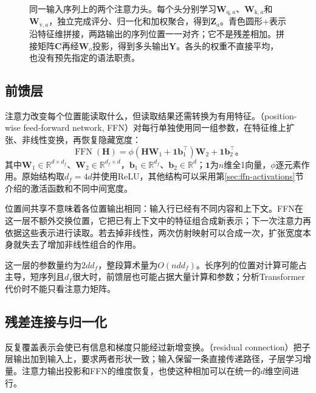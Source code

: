\begin{figure}[p]
  \centering
  
  \caption{同一输入序列上的两个注意力头。每个头分别学习$\bm W_{\mathrm q,a}$、$\bm W_{\mathrm k,a}$和$\bm W_{\mathrm v,a}$，独立完成评分、归一化和加权聚合，得到$\bm Z_a$。青色圆形$+$表示沿特征维拼接，两路输出的序列位置一一对齐；它不是残差相加。拼接矩阵$\bm C$再经$\bm W_{\mathrm o}$投影，得到多头输出$\bm Y$。各头的权重不直接平均，也没有预先指定的语法职责。}
  \label{fig:transformer-multihead}
\end{figure}
\FloatBarrier

\subsection{前馈层}
\label{sec:transformer-feedforward}

注意力改变每个位置能读取什么，但读取结果还需转换为有用特征。（position-wise feed-forward network, FFN）对每行单独使用同一组参数，在特征维上扩张、非线性变换，再恢复隐藏宽度：
\begin{equation}
  \operatorname{FFN}(\bm H)
  =\phi(\bm H\bm W_1+\bm 1\bm b_1^{\top})\bm W_2
      +\bm 1\bm b_2^{\top}\text{。}
  \label{eq:transformer-ffn}
\end{equation}
其中$\bm W_1\in\mathbb R^{d\times d_f}$、$\bm W_2\in\mathbb R^{d_f\times d}$，$\bm b_1\in\mathbb R^{d_f}$、$\bm b_2\in\mathbb R^d$；$\bm 1$为$n$维全1向量，$\phi$逐元素作用。原始结构取$d_f=4d$并使用ReLU，其他结构可以采用第\ref{sec:ffn-activations}节介绍的激活函数和不同中间宽度。

位置间共享不意味着各位置输出相同：输入行已经有不同内容和上下文。FFN在这一层不额外交换位置，它把已有上下文中的特征组合成新表示；下一次注意力再依据这些表示进行读取。若去掉非线性，两次仿射映射可以合成一次，扩张宽度本身就失去了增加非线性组合的作用。

这一层的参数量约为$2dd_f$，整段算术量为$O(ndd_f)$。长序列的位置对计算可能占主导，短序列且$d_f$很大时，前馈层也可能占据大量计算和参数；分析Transformer代价时不能只看注意力矩阵。

\subsection{残差连接与归一化}
\label{sec:transformer-residual-normalization}

反复覆盖表示会使已有信息和梯度只能经过新增变换。（residual connection）把子层输出加到输入上，要求两者形状一致；输入保留一条直接传递路径，子层学习增量。注意力输出投影和FFN的维度恢复，也使这种相加可以在统一的$d$维空间进行。

